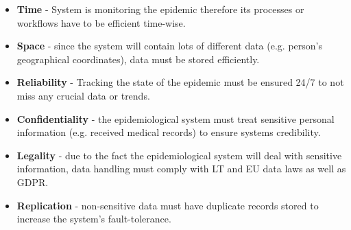 \documentclass{VUMIFPSkursinis}
\begin{document}
	\begin{itemize}
		\item{\textbf{Time} - System is monitoring the epidemic therefore its processes or workflows have to be efficient time-wise.}
		\item{\textbf{Space} - since the system will contain lots of different data (e.g. person's geographical coordinates), data must be stored efficiently.}		
		\item{\textbf{Reliability} - Tracking the state of the epidemic must be ensured 24/7 to not miss any crucial data or trends.}
		\item{\textbf{Confidentiality} - the epidemiological system must treat sensitive personal information (e.g. received medical records) to ensure systems credibility.}
		\item {\textbf{Legality} - due to the fact the epidemiological system will deal with sensitive information, data handling must comply with LT and EU data laws as well as GDPR.}
		\item{\textbf{Replication} - non-sensitive data must have duplicate records stored to increase the system's fault-tolerance.}
	\end{itemize}
\end{document}
